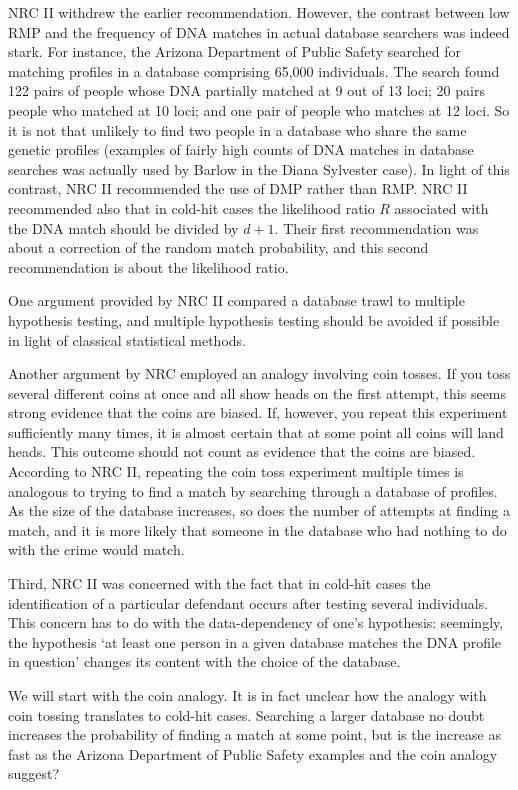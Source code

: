 \documentclass[10pt,dvipsnames,enabledeprecatedfontcommands]{scrartcl}
\begin{document}
NRC II withdrew the earlier recommendation. However, the contrast
between low RMP and the frequency of DNA matches in actual database
searchers was indeed stark. For instance, the Arizona Department of
Public Safety searched for matching profiles in a database comprising
65,000 individuals. The search found 122 pairs of people whose DNA
partially matched at 9 out of 13 loci; 20 pairs people who matched at 10
loci; and one pair of people who matches at 12 loci. So it is not that
unlikely to find two people in a database who share the same genetic
profiles (examples of fairly high counts of DNA matches in database
searches was actually used by Barlow in the Diana Sylvester case). In
light of this contrast, NRC II recommended the use of DMP rather than
RMP. NRC II recommended also that in cold-hit cases the likelihood ratio
\(R\) associated with the DNA match should be divided by \(d+1\). Their
first recommendation was about a correction of the random match
probability, and this second recommendation is about the likelihood
ratio.

One argument provided by NRC II compared a database trawl to multiple
hypothesis testing, and multiple hypothesis testing should be avoided if
possible in light of classical statistical methods.

Another argument by NRC employed an analogy involving coin tosses. If
you toss several different coins at once and all show heads on the first
attempt, this seems strong evidence that the coins are biased. If,
however, you repeat this experiment sufficiently many times, it is
almost certain that at some point all coins will land heads. This
outcome should not count as evidence that the coins are biased.
According to NRC II, repeating the coin toss experiment multiple times
is analogous to trying to find a match by searching through a database
of profiles. As the size of the database increases, so does the number
of attempts at finding a match, and it is more likely that someone in
the database who had nothing to do with the crime would match.

Third, NRC II was concerned with the fact that in cold-hit cases the
identification of a particular defendant occurs after testing several
individuals. This concern has to do with the data-dependency of one's
hypothesis: seemingly, the hypothesis `at least one person in a given
database matches the DNA profile in question' changes its content with
the choice of the database.

We will start with the coin analogy. It is in fact unclear how the
analogy with coin tossing translates to cold-hit cases. Searching a
larger database no doubt increases the probability of finding a match at
some point, but is the increase as fast as the Arizona Department of
Public Safety examples and the coin analogy suggest?
\end{document}
